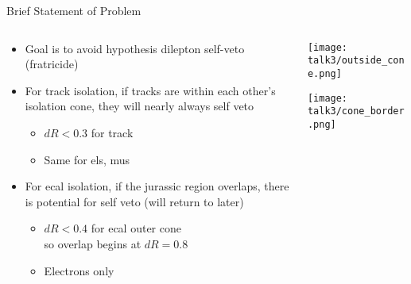 \documentclass{beamer}
\begin{document}
\begin{frame}{Brief Statement of Problem}
  \begin{columns}
    \begin{column}{0.5\linewidth}
      \begin{itemize}
      \item Goal is to avoid hypothesis dilepton self-veto (fratricide)
      \item For track isolation, if tracks are within each other's isolation cone, they will nearly always self veto
        \begin{itemize}
        \item $dR < 0.3$ for track
        \item Same for els, mus
        \end{itemize}
      \item For ecal isolation, if the jurassic region overlaps, there is potential for self veto (will return to later)
        \begin{itemize}
        \item $dR < 0.4$ {\small{for ecal outer cone}}\\ so overlap begins at $dR = 0.8$
        \item Electrons only
        \end{itemize}
      \end{itemize}
      
    \end{column}
    
    \begin{column}{0.5\linewidth}
      \texttt{[image: talk3/outside\_cone.png]}

      \texttt{[image: talk3/cone\_border.png]}
    \end{column}
  \end{columns}
\end{frame}
\end{document}
